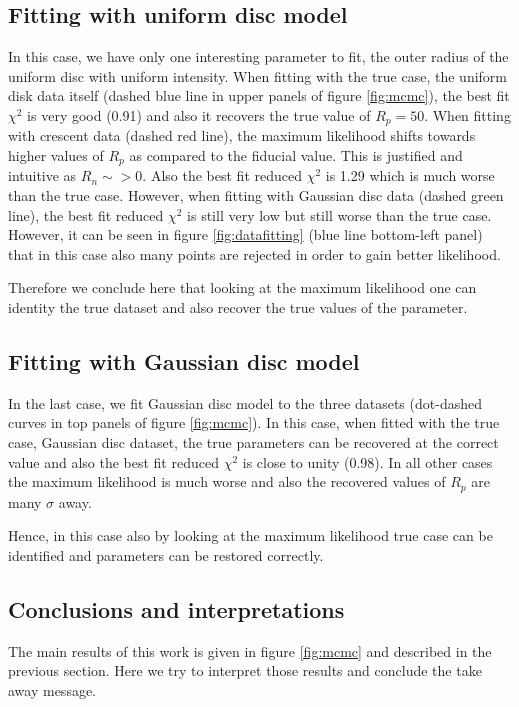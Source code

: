 \subsection{Fitting with uniform disc model}
In this case, we have only one interesting parameter to fit, the outer radius of the uniform disc with uniform intensity. When fitting with the true case, the uniform disk data itself (dashed blue line in upper panels of figure \ref{fig:mcmc}), the best fit $\chi^2$ is very good (0.91) and also it recovers the true value of $R_p=50$. When fitting with crescent data (dashed red line), the maximum likelihood shifts towards higher values of $R_p$ as compared to the fiducial value. This is justified and intuitive as $R_n \sim > 0$. Also the best fit reduced $\chi^2$ is 1.29 which is much worse than the true case. However, when fitting with Gaussian disc data (dashed green line), the best fit reduced $\chi^2$ is still very low but still worse than the true case. However, it can be seen in figure \ref{fig:datafitting} (blue line bottom-left panel) that in this case also many points are rejected in order to gain better likelihood.

Therefore we conclude here that looking at the maximum likelihood one can identity the true dataset and also recover the true values of the parameter. 


\subsection{Fitting with Gaussian disc model}
In the last case, we fit Gaussian disc model to the three datasets (dot-dashed curves in top panels of figure \ref{fig:mcmc}). In this case, when fitted with the true case, Gaussian disc dataset, the true parameters can be recovered at the correct value and also the best fit reduced $\chi^2$ is close to unity (0.98). In all other cases the maximum likelihood is much worse and also the recovered values of $R_p$ are many $\sigma$ away.

Hence, in this case also by looking at the maximum likelihood true case can be identified and parameters can be restored correctly.








\subsection{Conclusions and interpretations}
The main results of this work is given in figure \ref{fig:mcmc} and described in the previous section. Here we try to interpret those results and conclude the take away message.

